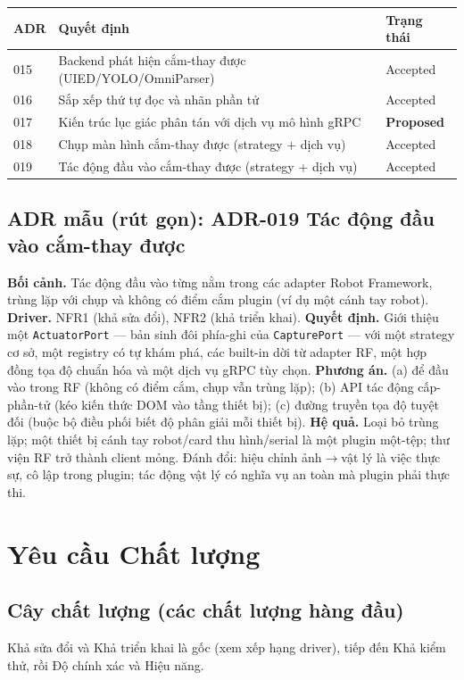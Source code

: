 \documentclass[11pt,a4paper]{report}
\newcommand{\code}[1]{\texttt{#1}}
\begin{document}
\begin{longtable}{@{}p{1.4cm}p{7.8cm}p{2.4cm}@{}}
\toprule
\textbf{ADR} & \textbf{Quyết định} & \textbf{Trạng thái} \\
\midrule
\endhead
015 & Backend phát hiện cắm-thay được (UIED/YOLO/OmniParser) & Accepted \\
016 & Sắp xếp thứ tự đọc và nhãn phần tử & Accepted \\
017 & Kiến trúc lục giác phân tán với dịch vụ mô hình gRPC & \textbf{Proposed} \\
018 & Chụp màn hình cắm-thay được (strategy + dịch vụ) & Accepted \\
019 & Tác động đầu vào cắm-thay được (strategy + dịch vụ) & Accepted \\
\bottomrule
\end{longtable}

\section{ADR mẫu (rút gọn): ADR-019 Tác động đầu vào cắm-thay được}
\textbf{Bối cảnh.} Tác động đầu vào từng nằm trong các adapter Robot Framework, trùng
lặp với chụp và không có điểm cắm plugin (ví dụ một cánh tay robot). \textbf{Driver.}
NFR1 (khả sửa đổi), NFR2 (khả triển khai). \textbf{Quyết định.} Giới thiệu một
\code{ActuatorPort} --- bản sinh đôi phía-ghi của \code{CapturePort} --- với một
strategy cơ sở, một registry có tự khám phá, các built-in dời từ adapter RF, một hợp
đồng tọa độ chuẩn hóa và một dịch vụ gRPC tùy chọn. \textbf{Phương án.} (a) để đầu vào
trong RF (không có điểm cắm, chụp vẫn trùng lặp); (b) API tác động cấp-phần-tử (kéo
kiến thức DOM vào tầng thiết bị); (c) đường truyền tọa độ tuyệt đối (buộc bộ điều phối
biết độ phân giải mỗi thiết bị). \textbf{Hệ quả.} Loại bỏ trùng lặp; một thiết bị
cánh tay robot/card thu hình/serial là một plugin một-tệp; thư viện RF trở thành
client mỏng. Đánh đổi: hiệu chỉnh ảnh$\rightarrow$vật lý là việc thực sự, cô lập trong
plugin; tác động vật lý có nghĩa vụ an toàn mà plugin phải thực thi.

\chapter{Yêu cầu Chất lượng}
\section{Cây chất lượng (các chất lượng hàng đầu)}
Khả sửa đổi và Khả triển khai là gốc (xem xếp hạng driver), tiếp đến Khả kiểm thử,
rồi Độ chính xác và Hiệu năng.
\end{document}
